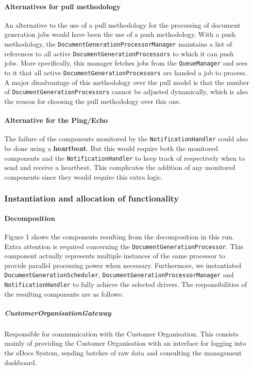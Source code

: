 \documentclass[a4paper,10pt]{article}
\begin{document}
\paragraph{Alternatives for pull methodology}
An alternative to the use of a pull methodology for the processing of document generation jobs would have been the use of a push methodology. With a push methodology, the \texttt{DocumentGenerationProcessorManager} maintains a list of references to all active \texttt{DocumentGenerationProcessors} to which it can push jobs. More specifically, this manager fetches jobs from the \texttt{QueueManager} and sees to it that all active \texttt{DocumentGenerationProcessors} are handed a job to process. A major disadvantage of this methodology over the pull model is that the number of \texttt{DocumentGenerationProcessors} cannot be adjusted dynamically, which is also the reason for choosing the pull methodology over this one.

\paragraph{Alternative for the Ping/Echo}
The failure of the components monitored by the \texttt{NotificationHandler} could also be done using a \textbf{heartbeat}. But this would require both the monitored components and the \texttt{NotificationHandler} to keep track of respectively when to send and receive a heartbeat. This complicates the addition of any monitored components since they would require this extra logic.


\subsubsection{Instantiation and allocation of functionality}
\paragraph{Decomposition}
Figure 1 shows the components resulting from the decomposition in this run. Extra attention is required concerning the \texttt{DocumentGenerationProcessor}. This component actually represents multiple instances of the same processor to provide parallel processing power when necessary.
Furthermore, we instantiated \texttt{DocumentGenerationScheduler}, \texttt{DocumentGenerationProcessorManager} and \texttt{NotificationHandler} to fully achieve the selected drivers.
The responsibilities of the resulting components are as follows:

\subparagraph{CustomerOrganisationGateway}
Responsible for communication with the Customer Organisation. This consists mainly of providing the Customer Organisation with an interface for logging into the eDocs System, sending batches of raw data and consulting the management dashboard.
\end{document}
